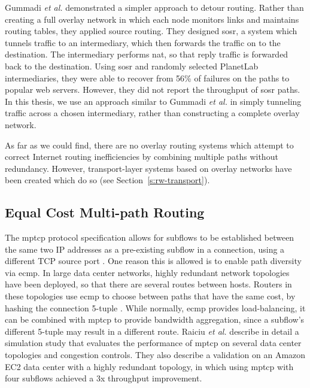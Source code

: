 \documentclass{cwru}
\begin{document}
Gummadi \textit{et al.} \cite{gummadi2004improving} demonstrated a simpler
approach to detour routing. Rather than creating a full overlay network in which
each node monitors links and maintains routing tables, they applied source
routing. They designed \ac{sosr}, a system which tunnels traffic to an
intermediary, which then forwards the traffic on to the destination. The
intermediary performs \ac{nat}, so that reply traffic is forwarded back to the
destination. Using \ac{sosr} and randomly selected PlanetLab intermediaries,
they were able to recover from 56\% of failures on the paths to popular web
servers. However, they did not report the throughput of \ac{sosr} paths. In this
thesis, we use an approach similar to Gummadi \textit{et al.} in simply
tunneling traffic across a chosen intermediary, rather than constructing a
complete overlay network.

As far as we could find, there are no overlay routing systems which attempt to
correct Internet routing inefficiencies by combining multiple paths without
redundancy. However, transport-layer systems based on overlay networks have been
created which do so (see Section~\ref{s:rw-transport}).

\subsection{Equal Cost Multi-path Routing}
\label{sec:ecmp}

The \ac{mptcp} protocol specification allows for subflows to be established
between the same two IP addresses as a pre-existing subflow in a connection,
using a different TCP source port \cite{rfc6824}. One reason this is allowed is
to enable path diversity via \acf{ecmp}. In large data center networks, highly
redundant network topologies have been deployed, so that there are several
routes between hosts. Routers in these topologies use \ac{ecmp} to choose
between paths that have the same cost, by hashing the connection 5-tuple
\cite{raiciu2011improving}. While normally, \ac{ecmp} provides load-balancing,
it can be combined with \ac{mptcp} to provide bandwidth aggregation, since a
subflow's different 5-tuple may result in a different route. Raiciu \textit{et
  al.} \cite{raiciu2011improving} describe in detail a simulation study that
evaluates the performance of \ac{mptcp} on several data center topologies and
congestion controls. They also describe a validation on an Amazon EC2 data
center with a highly redundant topology, in which using \ac{mptcp} with four
subflows achieved a 3x throughput improvement.
\end{document}
